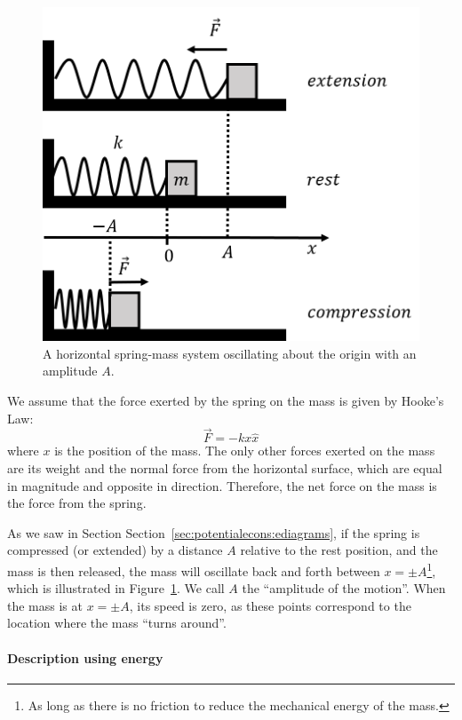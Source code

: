 \begin{figure}[!htbp]
\centering
\includegraphics[width=0.6\linewidth]{files/spring-e6d47243885eb7276547802f935f9caf.png}
\caption[]{A horizontal spring-mass system oscillating about the origin with an amplitude $A$.}
\label{fig:simpleharmonicmotion:spring}
\end{figure}

We assume that the force exerted by the spring on the mass is given by Hooke's Law:
\begin{equation}
\vec F = -kx \hat x
\end{equation}
where $x$ is the position of the mass. The only other forces exerted on the mass are its weight and the normal force from the horizontal surface, which are equal in magnitude and opposite in direction. Therefore, the net force on the mass is the force from the spring.

As we saw in Section Section~\ref{sec:potentialecons:ediagrams}, if the spring is compressed  (or extended) by a distance $A$ relative to the rest position, and the mass is then released, the mass will oscillate back and forth between $x=\pm A$\footnote{As long as there is no friction to reduce the mechanical energy of the mass.}, which is illustrated in Figure~\ref{fig:simpleharmonicmotion:spring}. We call $A$ the ``amplitude of the motion''. When the mass is at $x=\pm A$, its speed is zero, as these points correspond to the location where the mass ``turns around''.

\paragraph{Description using energy}

